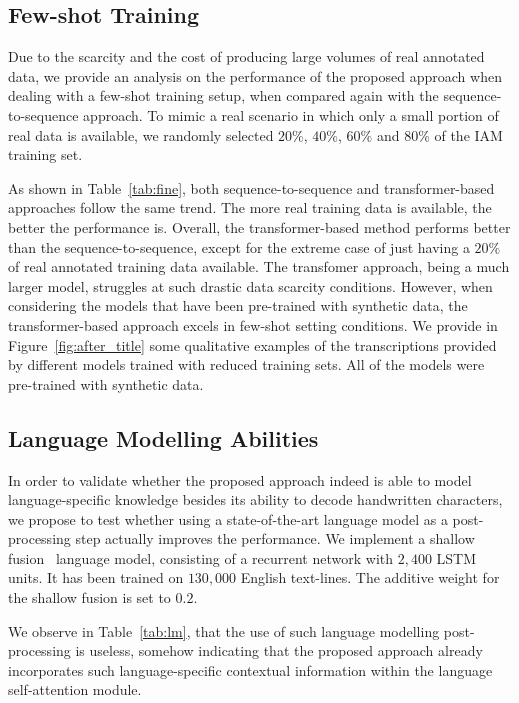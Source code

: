 \documentclass[10pt,twocolumn,letterpaper]{article}
\begin{document}
\subsection{Few-shot Training}
Due to the scarcity and the cost of producing large volumes of real annotated data, we provide an analysis on the performance of the proposed approach when dealing with a few-shot training setup, when compared again with the sequence-to-sequence approach. To mimic a real scenario in which only a small portion of real data is available, we randomly selected $20\%$, $40\%$, $60\%$ and $80\%$ of the IAM training set.




As shown in Table~\ref{tab:fine}, both sequence-to-sequence and transformer-based approaches follow the same trend. The more real training data is available, the better the performance is. Overall, the transformer-based method performs better than the sequence-to-sequence, except for the extreme case of just having a $20\%$ of real annotated training data available. The transfomer approach, being a much larger model, struggles at such drastic data scarcity conditions. However, when considering the models that have been pre-trained with synthetic data, the transformer-based approach excels in few-shot setting conditions. We provide in Figure~\ref{fig:after_title} some qualitative examples of the transcriptions provided by different models trained with reduced training sets. All of the models were pre-trained with synthetic data.







\subsection{Language Modelling Abilities}
In order to validate whether the proposed approach indeed is able to model language-specific knowledge besides its ability to decode handwritten characters, we propose to test whether using a state-of-the-art language model as a post-processing step actually improves the performance. We implement a shallow fusion~\cite{gulcehre2015using} language model, consisting of a recurrent network with $2,400$ LSTM units. It has been trained on $130,000$ English text-lines. The additive weight for the shallow fusion is set to $0.2$.

We observe in Table~\ref{tab:lm}, that the use of such language modelling post-processing is useless, somehow indicating that the proposed approach already incorporates such language-specific contextual information within the language self-attention module.
\end{document}
